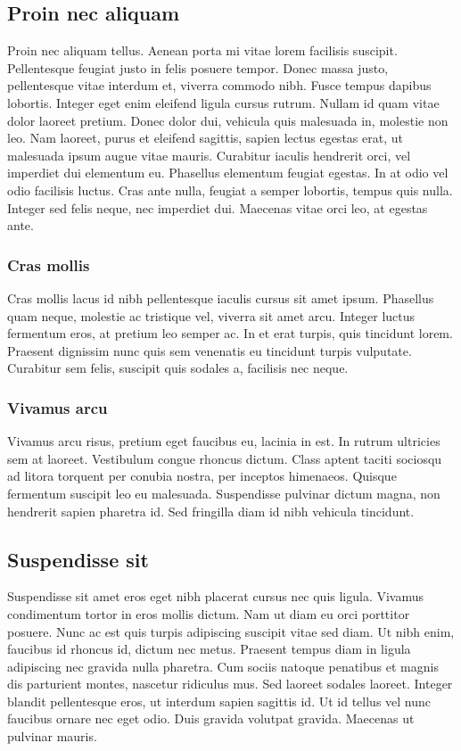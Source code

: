 \subsection{Proin nec aliquam}

Proin nec aliquam tellus. Aenean porta mi vitae lorem facilisis suscipit. Pellentesque feugiat justo in felis posuere tempor. Donec massa justo, pellentesque vitae interdum et, viverra commodo nibh. Fusce tempus dapibus lobortis. Integer eget enim eleifend ligula cursus rutrum. Nullam id quam vitae dolor laoreet pretium. Donec dolor dui, vehicula quis malesuada in, molestie non leo. Nam laoreet, purus et eleifend sagittis, sapien lectus egestas erat, ut malesuada ipsum augue vitae mauris. Curabitur iaculis hendrerit orci, vel imperdiet dui elementum eu. Phasellus elementum feugiat egestas. In at odio vel odio facilisis luctus. Cras ante nulla, feugiat a semper lobortis, tempus quis nulla. Integer sed felis neque, nec imperdiet dui. Maecenas vitae orci leo, at egestas ante. 

\subsubsection{Cras mollis}

Cras mollis lacus id nibh pellentesque iaculis cursus sit amet ipsum. Phasellus quam neque, molestie ac tristique vel, viverra sit amet arcu. Integer luctus fermentum eros, at pretium leo semper ac. In et erat turpis, quis tincidunt lorem. Praesent dignissim nunc quis sem venenatis eu tincidunt turpis vulputate. Curabitur sem felis, suscipit quis sodales a, facilisis nec neque. 

\subsubsection{Vivamus arcu}

Vivamus arcu risus, pretium eget faucibus eu, lacinia in est. In rutrum ultricies sem at laoreet. Vestibulum congue rhoncus dictum. Class aptent taciti sociosqu ad litora torquent per conubia nostra, per inceptos himenaeos. Quisque fermentum suscipit leo eu malesuada. Suspendisse pulvinar dictum magna, non hendrerit sapien pharetra id. Sed fringilla diam id nibh vehicula tincidunt. 

\subsection{Suspendisse sit}

Suspendisse sit amet eros eget nibh placerat cursus nec quis ligula. Vivamus condimentum tortor in eros mollis dictum. Nam ut diam eu orci porttitor posuere. Nunc ac est quis turpis adipiscing suscipit vitae sed diam. Ut nibh enim, faucibus id rhoncus id, dictum nec metus. Praesent tempus diam in ligula adipiscing nec gravida nulla pharetra. Cum sociis natoque penatibus et magnis dis parturient montes, nascetur ridiculus mus. Sed laoreet sodales laoreet. Integer blandit pellentesque eros, ut interdum sapien sagittis id. Ut id tellus vel nunc faucibus ornare nec eget odio. Duis gravida volutpat gravida. Maecenas ut pulvinar mauris. 